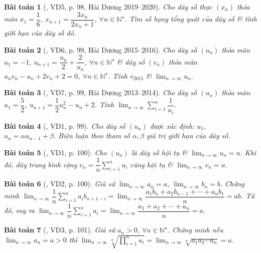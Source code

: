 \documentclass[oneside]{book}
\newtheorem{baitoan}{Bài toán}
\begin{document}
\begin{baitoan}[\cite{Hung_nang_cao_phat_trien_Toan_11_tap_1}, VD5, p. 98, Hải Dương 2019--2020]
	Cho dãy số thực $(x_n)$ thỏa mãn $x_1 = \dfrac{1}{6}$, $x_{n+1} = \dfrac{3x_n}{2x_n + 1}$, $\forall n\in\mathbb{N}^\star$. Tìm số hạng tổng quát của dãy số \& tính giới hạn của dãy số đó.
\end{baitoan}

\begin{baitoan}[\cite{Hung_nang_cao_phat_trien_Toan_11_tap_1}, VD6, p. 99, Hải Dương 2015--2016]
	Cho dãy số $(u_n)$ thỏa mãn $u_1 = -1$, $u_{n+1} = \dfrac{u_n}{2} + \dfrac{2}{u_n}$, $\forall n\in\mathbb{N}^\star$ \& dãy số $(v_n)$ thỏa mãn $u_nv_n - u_n + 2v_n + 2 = 0$, $\forall n\in\mathbb{N}^\star$. Tính $v_{2015}$ \& $\lim_{n\to\infty} u_n$.
\end{baitoan}

\begin{baitoan}[\cite{Hung_nang_cao_phat_trien_Toan_11_tap_1}, VD7, p. 99, Hải Dương 2013--2014]
	Cho dãy số $(u_n)$ thỏa mãn $u_1 = \dfrac{5}{2}$, $u_{n+1} = \dfrac{1}{2}u_n^2 - u_n + 2$. Tính $\lim_{n\to\infty} \sum_{i=1}^n \dfrac{1}{u_i}$.
\end{baitoan}

\begin{baitoan}[\cite{Hung_nang_cao_phat_trien_Toan_11_tap_1}, VD1, p. 99]
	Cho dãy số $(u_n)$ được xác định: $u_1$, $u_n = \alpha u_{n-1} + \beta$. Biện luận theo tham số $\alpha,\beta$ giá trị giới hạn của dãy số.
\end{baitoan}

\begin{baitoan}[\cite{Hung_nang_cao_phat_trien_Toan_11_tap_1}, VD1, p. 100]
	Cho $(u_n)$ là dãy số hội tụ \& $\lim_{n\to\infty} u_n = u$. Khi đó, dãy trung bình cộng $v_n =  \dfrac{1}{n}\sum_{i=1}^n u_i$ cũng hội tụ \& $\lim_{n\to\infty} v_n = u$.
\end{baitoan}

\begin{baitoan}[\cite{Hung_nang_cao_phat_trien_Toan_11_tap_1}, VD2, p. 100]
	Giả sử $\lim_{n\to\infty} a_n = a$, $\lim_{n\to\infty} b_n = b$. Chứng minh $\lim_{n\to\infty} \dfrac{1}{n}\sum_{i=1}^n a_ib_{n+1-i} = \lim_{n\to\infty} \dfrac{a_1b_n + a_2b_{n-1} + \cdots + a_nb_1}{n} = ab$.  Từ đó, suy ra $\lim_{n\to\infty} \dfrac{1}{n}\sum_{i=1}^n a_i = \lim_{n\to\infty} \dfrac{a_1 + a_2 + \cdots + a_n}{n}= a$.
\end{baitoan}

\begin{baitoan}[\cite{Hung_nang_cao_phat_trien_Toan_11_tap_1}, VD3, p. 101]
	Giả sử $a_n > 0$, $\forall n\in\mathbb{N}^\star$. Chứng minh nếu $\lim_{n\to\infty} a_n = a > 0$ thì $\lim_{n\to\infty} \sqrt[n]{\prod_{i=1}^n a_i} = \lim_{n\to\infty} \sqrt[n]{a_1a_2\cdots a_n} = a$.
\end{baitoan}
\end{document}
